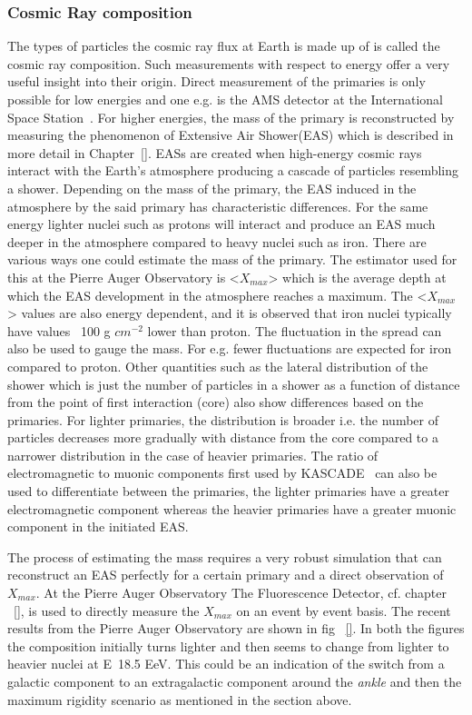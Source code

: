 \subsubsection*{Cosmic Ray composition}
\label{subsubsec:CRcompo}
The types of particles the cosmic ray flux at Earth is made up of is called the cosmic ray composition. Such measurements with respect to energy offer a very useful insight into their origin. Direct measurement of the primaries is only possible for low energies and one e.g. is the AMS detector at the International Space Station~\cite{}. For higher energies, the mass of the primary is reconstructed by measuring the phenomenon of Extensive Air Shower(EAS) which is described in more detail in Chapter~\ref{}. EASs are created when high-energy cosmic rays interact with the Earth's atmosphere producing a cascade of particles resembling a shower.  Depending on the mass of the primary, the EAS induced in the atmosphere by the said primary has characteristic differences. For the same energy lighter nuclei such as protons will interact and produce an EAS much deeper in the atmosphere compared to heavy nuclei such as iron. There are various ways one could estimate the mass of the primary. The estimator used for this at the Pierre Auger Observatory is <$X_{max}$> which is the average depth at which the EAS development in the atmosphere reaches a maximum. The <$X_{max}$> values are also energy dependent, and it is observed that iron nuclei typically have values ~100 g $cm^{-2}$ lower than proton. The fluctuation in the spread can also be used to gauge the mass. For e.g. fewer fluctuations are expected for iron compared to proton. Other quantities such as the lateral distribution of the shower which is just the number of particles in a shower as a function of distance from the point of first interaction (core) also show differences based on the primaries. For lighter primaries, the distribution is broader i.e. the number of particles decreases more gradually with distance from the core compared to a narrower distribution in the case of heavier primaries. The ratio of electromagnetic to muonic components first used by KASCADE~\cite{} can also be used to differentiate between the primaries, the lighter primaries have a greater electromagnetic component whereas the heavier primaries have a greater muonic component in the initiated EAS.    

The process of estimating the mass requires a very robust simulation that can reconstruct an EAS perfectly for a certain primary and a direct observation of $X_{max}$. At the Pierre Auger Observatory The Fluorescence Detector, cf. chapter ~\ref{}, is used to directly measure the $X_{max}$ on an event by event basis. The recent results from the Pierre Auger Observatory are shown in fig ~\ref{}. In both the figures the composition initially turns lighter and then seems to change from lighter to heavier nuclei at E~18.5 EeV. This could be an indication of the switch from a galactic component to an extragalactic component around the \textit{ankle} and then the maximum rigidity scenario as mentioned in the section above.

